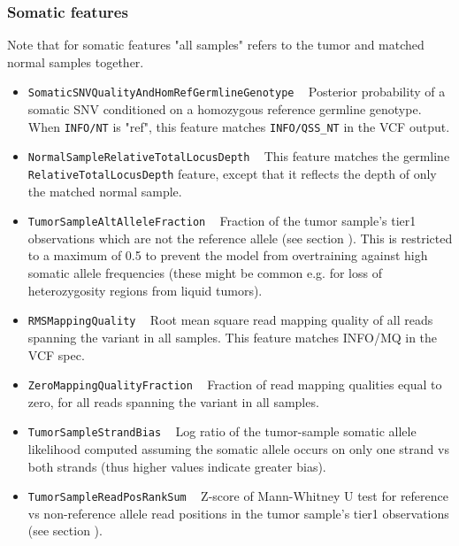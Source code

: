 \documentclass{article}
\begin{document}
\subsubsection{Somatic features}

Note that for somatic features "all samples" refers to the tumor and matched normal samples together.

\begin{itemize}

    \item \texttt{SomaticSNVQualityAndHomRefGermlineGenotype} ~ Posterior probability of a somatic SNV conditioned on a homozygous reference germline genotype. When \texttt{INFO/NT} is "ref", this feature matches \texttt{INFO/QSS\_NT} in the VCF output.

    \item \texttt{NormalSampleRelativeTotalLocusDepth} ~ This feature matches the germline \texttt{RelativeTotalLocusDepth} feature, except that it reflects the depth of only the matched normal sample.

    \item \texttt{TumorSampleAltAlleleFraction} ~ Fraction of the tumor sample's tier1 observations which are not the reference allele (see section ). This is restricted to a maximum of 0.5 to prevent the model from overtraining against high somatic allele frequencies (these might be common e.g. for loss of heterozygosity regions from liquid tumors).

    \item \texttt{RMSMappingQuality} ~ Root mean square read mapping quality of all reads spanning the variant in all samples. This feature matches INFO/MQ in the VCF spec.

    \item \texttt{ZeroMappingQualityFraction} ~ Fraction of read mapping qualities equal to zero, for all reads spanning the variant in all samples.

    \item \texttt{TumorSampleStrandBias} ~ Log ratio of the tumor-sample somatic allele likelihood computed assuming the somatic allele occurs on only one strand vs both strands
    (thus higher values indicate greater bias).

    \item \texttt{TumorSampleReadPosRankSum} ~ Z-score of Mann-Whitney U test for reference vs non-reference allele read positions in the tumor sample's tier1 observations (see section ).


\end{itemize}
\end{document}
